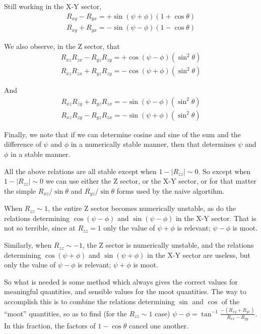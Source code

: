 \documentclass[twoside,12pt]{article}
\begin{document}
Still working in the X-Y sector, 
\begin{eqnarray}
R_{xy} - R_{yx} = + \sin ( \psi + \phi ) (1 + \cos \theta) \\
R_{xy} + R_{yx} = - \sin ( \psi - \phi ) (1 - \cos \theta) 
\end{eqnarray}

We also observe, in the Z sector, that
\begin{eqnarray}
R_{xz} R_{zx} - R_{yz} R_{zy} = + \cos ( \psi - \phi ) (\sin^2 \theta) \\
R_{xz} R_{zx} + R_{yz} R_{zy} = - \cos ( \psi + \phi ) (\sin^2 \theta)
\end{eqnarray}

And 
\begin{eqnarray}
R_{xz} R_{zy} + R_{yz} R_{zx} = - \sin ( \psi - \phi ) (\sin^2 \theta) \\
R_{xz} R_{zy} - R_{yz} R_{zx} = - \sin ( \psi + \phi ) (\sin^2 \theta)
\end{eqnarray}

Finally, we note that if we can determine cosine and sine of the sum and the 
difference of $\psi$ and $\phi$ in a numerically stable manner, then that
determines $\psi$ and $\phi$ in a stable manner. 

All the above relations are all stable except when $1- |R_{zz}| \sim 0$.
So except when $1- |R_{zz}| \sim 0$ we can use either the Z sector, 
or the X-Y sector, or for
that matter the simple $R_{xz}/\sin \theta$ and $R_{yz}/\sin \theta$ forms
used by the naive algortihm.

When $R_{zz} \sim 1$, the entire Z sector becomes numerically unstable, 
as do the relations determining $\cos ( \psi - \phi )$ and 
$\sin ( \psi - \phi )$ in the X-Y sector.  
That is not so terrible, since at $R_{zz} = 1$ only the value of 
$\psi + \phi$ is relevant; $\psi - \phi$ is moot.

Similarly, when $R_{zz} \sim -1$, the  Z sector is numerically unstable, 
and the relations determining $\cos ( \psi + \phi )$ and 
$\sin ( \psi + \phi )$ in the X-Y sector are useless, but only the value of 
$\psi - \phi$ is relevant; $\psi + \phi$ is moot.
 
So what is needed is some method which always gives the correct values
for meaningful quantities, and sensible values for the
moot quantities.
The way to accomplish this is to combine the relations determining $\sin$ and
$\cos$ of the ``moot'' quantities, so as to find (for the $R_{zz} \sim 1$ case)
$\psi - \phi = \tan^{-1} \frac{ -(R_{xy} + R_{yx}) }{ R_{xx} - R_{yy} }$. 
In this fraction, the factors of $1 - \cos \theta$ cancel one another. 
\end{document}
